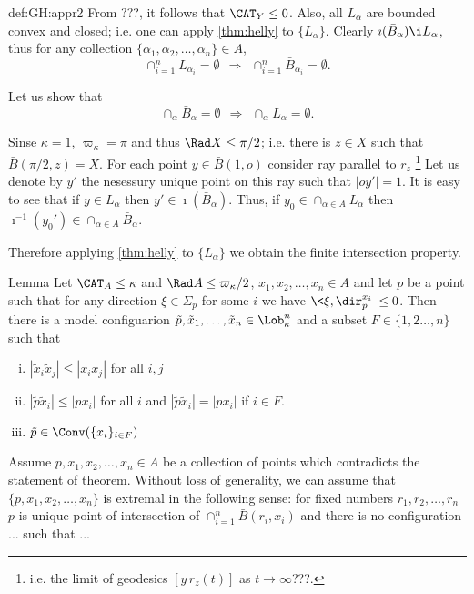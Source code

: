 {\begin{subthm}{def:GH:appr2}
From ???, it follows that $\CAT_Y\le 0$.
Also, all $L_\alpha$ are bounded convex and closed;
i.e. one can apply \ref{thm:helly} to $\{L_\alpha\}$.
Clearly $\imath(\bar B_\alpha)\i L_\alpha$, thus for any collection
$\{\alpha_1,\alpha_2,\dots,\alpha_n\}\in A$,
$$\cap_{i=1}^n L_{\alpha_i}=\emptyset 
\ \ 
\Longrightarrow
\ \ 
\cap_{i=1}^n \bar B_{\alpha_i}=\emptyset.$$

Let us show that 
$$\cap_\alpha \bar B_\alpha=\emptyset 
\ \ 
\Longrightarrow
\ \ 
\cap_\alpha L_\alpha=\emptyset.$$

Sinse $\kappa=1$, $\varpi_\kappa=\pi$ and thus $\Rad X\le\pi/2$; 
i.e. there is $z\in X$ such that $\bar B(\pi/2,z)=X$. 
For each point $y\in \bar B(1,o)$ consider ray parallel to $r_z$%
\footnote{i.e. the limit of geodesics $[y\, r_z(t)]$ as $t\to\infty$???.}
Let us denote by $y'$ the nesessury unique point on this ray such that $|oy'|=1$.
It is easy to see that if $y\in L_\alpha$ then 
$y'\in \imath(\bar B_\alpha)$.
Thus, if $y_0\in \cap_{\alpha\in A} L_\alpha$ then 
$\imath^{-1}(y_0')\in \cap_{\alpha\in A} \bar B_\alpha$.

Therefore applying \ref{thm:helly} to $\{L_\alpha\}$ we obtain 
the finite intersection property.
\qeds











\begin{thm}{Lemma}
Let $\CAT_A\le \kappa$ and $\Rad A\le \varpi_\kappa/2$, $x_1,x_2,\dots, x_n\in A$ and let $p$ be a point such that for any direction $\xi\in \Sigma_p$ for some $i$ we have $\<\xi,\dir_p^{x_i}\>\le0$.
Then there is a model configuarion 
$\tilde p,\tilde x_1,\dots,\tilde x_n\in\Lob_\kappa^{n}$ and a subset $F\in \{1,2\dots,n\}$ such that 
\begin{enumerate}[(i)]
\item $|\tilde x_i\tilde x_j|\le|x_ix_j|$ for all $i,j$
\item $|\tilde p\tilde x_i|\le |px_i|$ for all $i$ and $|\tilde p\tilde x_i|=|px_i|$ if $i\in F$.
\item \label{conv-cond} $\tilde p\in \Conv(\{x_i\}_{i\in F})$
\end{enumerate}
\end{thm}

\parit{Proof.} Assume $p,x_1,x_2,\dots, x_n\in A$ be a collection of points which contradicts the statement of theorem. 
Without loss of generality, we can assume that $\{p,x_1,x_2,\dots, x_n\}$ is extremal in the following sense: for fixed numbers $r_1,r_2,\dots,r_n$ 
$p$ is unique point of intersection of $\cap_{i=1}^n\bar B(r_i,x_i)$ and there is no configuration ... such that ...


\end{subthm}}
